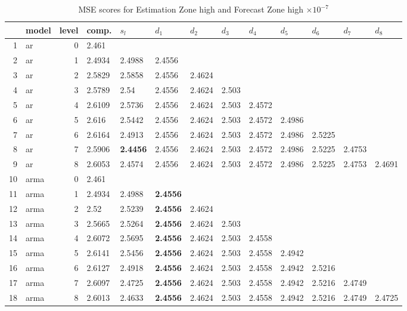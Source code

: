 \documentclass[10pt,a4paper]{article}
\begin{document}
\begin{table}[ht]
\centering
\caption{MSE scores for Estimation Zone high and Forecast Zone high $ \times 10^{-7}$} 
\begin{tabular}{rlrllllllllll}
  \hline
 & model & level & comp. & $s_l$ & $d_1$ & $d_2$ & $d_3$ & $d_4$ & $d_5$ & $d_6$ & $d_7$ & $d_8$ \\ 
  \hline
1 & ar &     0 & 2.461 &  &  &  &  &  &  &  &  &  \\ 
  2 & ar &     1 & 2.4934 & 2.4988 & 2.4556 &  &  &  &  &  &  &  \\ 
  3 & ar &     2 & 2.5829 & 2.5858 & 2.4556 & 2.4624 &  &  &  &  &  &  \\ 
  4 & ar &     3 & 2.5789 & 2.54 & 2.4556 & 2.4624 & 2.503 &  &  &  &  &  \\ 
  5 & ar &     4 & 2.6109 & 2.5736 & 2.4556 & 2.4624 & 2.503 & 2.4572 &  &  &  &  \\ 
  6 & ar &     5 & 2.616 & 2.5442 & 2.4556 & 2.4624 & 2.503 & 2.4572 & 2.4986 &  &  &  \\ 
  7 & ar &     6 & 2.6164 & 2.4913 & 2.4556 & 2.4624 & 2.503 & 2.4572 & 2.4986 & 2.5225 &  &  \\ 
  8 & ar &     7 & 2.5906 & \textbf{2.4456} & 2.4556 & 2.4624 & 2.503 & 2.4572 & 2.4986 & 2.5225 & 2.4753 &  \\ 
  9 & ar &     8 & 2.6053 & 2.4574 & 2.4556 & 2.4624 & 2.503 & 2.4572 & 2.4986 & 2.5225 & 2.4753 & 2.4691 \\ 
   \hline
10 & arma &     0 & 2.461 &  &  &  &  &  &  &  &  &  \\ 
  11 & arma &     1 & 2.4934 & 2.4988 & \textbf{2.4556} &  &  &  &  &  &  &  \\ 
  12 & arma &     2 & 2.52 & 2.5239 & \textbf{2.4556} & 2.4624 &  &  &  &  &  &  \\ 
  13 & arma &     3 & 2.5665 & 2.5264 & \textbf{2.4556} & 2.4624 & 2.503 &  &  &  &  &  \\ 
  14 & arma &     4 & 2.6072 & 2.5695 & \textbf{2.4556} & 2.4624 & 2.503 & 2.4558 &  &  &  &  \\ 
  15 & arma &     5 & 2.6141 & 2.5456 & \textbf{2.4556} & 2.4624 & 2.503 & 2.4558 & 2.4942 &  &  &  \\ 
  16 & arma &     6 & 2.6127 & 2.4918 & \textbf{2.4556} & 2.4624 & 2.503 & 2.4558 & 2.4942 & 2.5216 &  &  \\ 
  17 & arma &     7 & 2.6097 & 2.4725 & \textbf{2.4556} & 2.4624 & 2.503 & 2.4558 & 2.4942 & 2.5216 & 2.4749 &  \\ 
  18 & arma &     8 & 2.6013 & 2.4633 & \textbf{2.4556} & 2.4624 & 2.503 & 2.4558 & 2.4942 & 2.5216 & 2.4749 & 2.4725 \\ 

\end{tabular}
\end{table}
\end{document}
